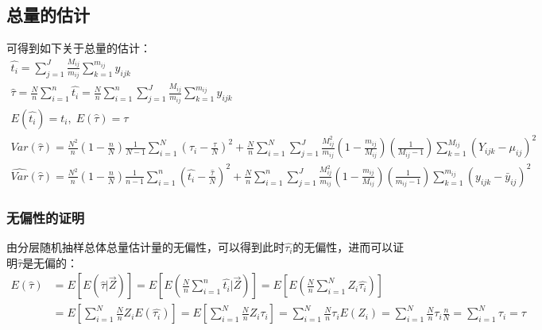 \subsection{总量的估计}
可得到如下关于总量的估计：
\begin{gather*}
	\hat{t_i}=\sum_{j=1}^{J}\frac{M_{ij}}{m_{ij}}\sum_{k=1}^{m_{ij}}y_{ijk} \\
	\hat{\tau}=\frac{N}{n}\sum_{i=1}^{n}\hat{t_i}=\frac{N}{n}\sum_{i=1}^{n}\sum_{j=1}^{J}\frac{M_{ij}}{m_{ij}}\sum_{k=1}^{m_{ij}}y_{ijk} \\
	E(\hat{t_i})=t_i,\;E(\hat{\tau})=\tau \\
	Var(\hat{\tau})=\frac{N^2}{n}\left(1-\frac{n}{N}\right)\frac{1}{N-1}\sum_{i=1}^{N}\left(\tau_i-\frac{\tau}{N}\right)^2+\frac{N}{n}\sum_{i=1}^{N}\sum_{j=1}^{J}\frac{M_{ij}^2}{m_{ij}}\left(1-\frac{m_{ij}}{M_{ij}}\right)\left(\frac{1}{M_{ij}-1}\right)\sum_{k=1}^{M_{ij}}\left(Y_{ijk}-\mu_{ij}\right)^2 \\
	\widehat{Var}(\hat{\tau})=\frac{N^2}{n}\left(1-\frac{n}{N}\right)\frac{1}{n-1}\sum_{i=1}^{n}\left(\hat{t_i}-\frac{\hat{\tau}}{N}\right)^2+\frac{N}{n}\sum_{i=1}^{n}\sum_{j=1}^{J}\frac{M_{ij}^2}{m_{ij}}\left(1-\frac{m_{ij}}{M_{ij}}\right)\left(\frac{1}{m_{ij}-1}\right)\sum_{k=1}^{m_{ij}}\left(y_{ijk}-\bar{y}_{ij}\right)^2 
\end{gather*}
\subsubsection{无偏性的证明}
由分层随机抽样总体总量估计量的无偏性，可以得到此时$\hat{\tau_i}$的无偏性，进而可以证明$\hat{\tau}$是无偏的：
\begin{align*}
	E(\hat{\tau})
	&=E[E(\hat{\tau}|\overrightarrow{Z})]
	=E\left[E\left(\frac{N}{n}\sum_{i=1}^{n}\hat{t_i}|\overrightarrow{Z}\right)\right]
	=E\left[E\left(\frac{N}{n}\sum_{i=1}^{N}Z_i\hat{\tau_i}\right)\right] \\ 
	&=E\left[\sum_{i=1}^{N}\frac{N}{n}Z_iE(\hat{\tau_i})\right]
	=E\left[\sum_{i=1}^{N}\frac{N}{n}Z_i\tau_i\right]
	=\sum_{i=1}^{N}\frac{N}{n}\tau_iE(Z_i)
	=\sum_{i=1}^{N}\frac{N}{n}\tau_i\frac{n}{N}
	=\sum_{i=1}^{N}\tau_i=\tau
\end{align*}
